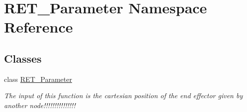 \hypertarget{namespaceRET__Parameter}{}\section{R\+E\+T\+\_\+\+Parameter Namespace Reference}
\label{namespaceRET__Parameter}
\subsection*{Classes}
\begin{DoxyCompactItemize}
\item 
class \hyperlink{classRET__Parameter_1_1RET__Parameter}{R\+E\+T\+\_\+\+Parameter}
\begin{DoxyCompactList}\small\item\em The input of this function is the cartesian position of the end effector given by another node!!!!!!!!!!!!!!! \end{DoxyCompactList}\end{DoxyCompactItemize}
